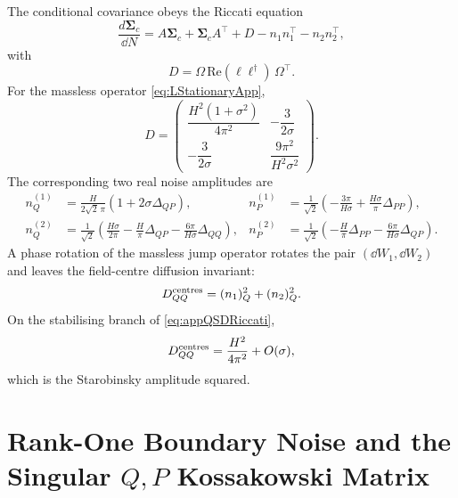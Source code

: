 \documentclass{article}
\def\nn{\nonumber}
\numberwithin{equation}{section}
\begin{document}
	The conditional covariance obeys the Riccati equation
	\begin{equation}
		\frac{d\mathbf{\Sigma}_c}{\dd N} = A\mathbf{\Sigma}_c+\mathbf{\Sigma}_cA^\top+D-n_1n_1^\top-n_2n_2^\top,
		\label{eq:appQSDRiccati}
	\end{equation}
	with
	\begin{equation}
		D=\Omega\,\mathrm{Re}(\ell\ell^\dagger)\,\Omega^\top .
	\end{equation}
	For the massless operator \cref{eq:LStationaryApp},
	\begin{equation}
		D =
		\begin{pmatrix}
			\dfrac{H^2(1+\sigma^2)}{4\pi^2} & -\dfrac{3}{2\sigma} \\[8pt] -\dfrac{3}{2\sigma} & \dfrac{9\pi^2}{H^2\sigma^2}
		\end{pmatrix}.
		\label{eq:appUnconditionalD}
	\end{equation}
	The corresponding two real noise amplitudes are
	\begin{align}
		n_Q^{(1)} &= \frac{H}{2\sqrt2\,\pi} \left( 1+2\sigma\Delta_{QP} \right), & n_P^{(1)} &= \frac{1}{\sqrt2} \left( -\frac{3\pi}{H\sigma} + \frac{H\sigma}{\pi}\Delta_{PP} \right), \nn\\ n_Q^{(2)} &= \frac{1}{\sqrt2} \left( \frac{H\sigma}{2\pi} - \frac{H}{\pi}\Delta_{QP} - \frac{6\pi}{H\sigma}\Delta_{QQ} \right), & n_P^{(2)} &= \frac{1}{\sqrt2} \left( -\frac{H}{\pi}\Delta_{PP} - \frac{6\pi}{H\sigma}\Delta_{QP} \right).
		\label{eq:appQSDMasslessNoises}
	\end{align}
	A phase rotation of the massless jump operator rotates the pair \((\dd W_1,\dd W_2)\) and leaves the field-centre diffusion invariant:
	\begin{equation}
		D_{QQ}^{\rm centres} = (n_1)_Q^2+(n_2)_Q^2 .
		\label{eq:appDQQcenters}
	\end{equation}
	On the stabilising branch of \cref{eq:appQSDRiccati},
	\begin{equation}
		D_{QQ}^{\rm centres} = \frac{H^2}{4\pi^2} + O(\sigma),
		\label{eq:appDQQStarobinskyQSD}
	\end{equation}	which is the Starobinsky amplitude squared.


	\section{Rank-One Boundary Noise and the Singular \texorpdfstring{$Q,P$}{Q,P} Kossakowski Matrix}
	\label{app:diagonal}
\end{document}
